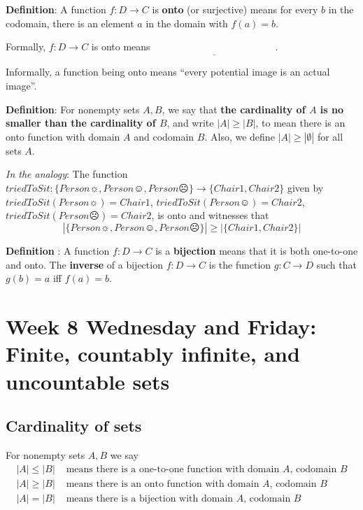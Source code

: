 \documentclass[12pt, oneside]{article}
\begin{document}
{\bf Definition}: A function $f: D  \to C$ is {\bf onto} (or  surjective) means for every $b$ in the codomain, 
there  is an element $a$ in the domain with  $f(a) = b$.

Formally, $f: D  \to  C$ is  onto  means $\underline{\phantom{\forall b \in C  \exists a \in D ( f(a) = b)}}$.
 

Informally, a function being onto means ``every potential image is an actual image''.

\phantom{Draw finite domain, finite codomain picture with duplicate image.}
\vspace{50pt} 

{\bf Definition}:  For nonempty sets $A, B$, we say that {\bf the  cardinality of $A$ is  no  smaller than 
the cardinality of  $B$}, and 
write $|A| \geq |B|$, to mean there is an onto function  with domain $A$  and codomain $B$.
Also, we define $|A| \geq |\emptyset|$ for all sets $A$.
 

{\it In the analogy}: The function $triedToSit: \{ Person\sun, Person\smiley, Person\frownie \} \to  \{ Chair1, Chair2\} $ given
by $triedToSit(Person\sun) = Chair1$,  $triedToSit(Person\smiley) = Chair2$, 
$triedToSit(Person\frownie) = Chair2$, is onto and witnesses that 
\[
 |\{ Person\sun, Person\smiley, Person\frownie \}| \geq | \{ Chair1, Chair2\} |
\] \vfill


{\bf Definition} : A function $f: D  \to C$ is a {\bf bijection} means that it is both 
one-to-one  and onto. The {\bf inverse} of a  bijection $f: D  \to  C$ is 
the function $g: C  \to  D$  such that $g(b) = a$ iff  $f(a) =  b$.
 \vfill


\newpage

\section*{Week 8 Wednesday and Friday: Finite, countably infinite, and uncountable sets}
\subsection*{Cardinality of sets}

For nonempty sets $A, B$ we say
\begin{align*}
|A| \leq |B| &\text{ means there is a one-to-one function with domain $A$, codomain $B$} \\
|A| \geq |B| &\text{ means there is an onto function with domain $A$, codomain $B$} \\
|A| = |B| &\text{ means there is a bijection with domain $A$, codomain $B$}
\end{align*}
\end{document}
